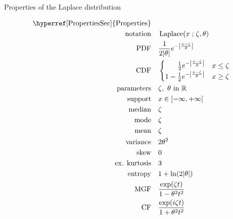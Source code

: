 

\begin{table*}[t!]
\caption[Laplace distribution -- Properties]{Properties of the Laplace distribution}
\begin{align*}
\text{\hyperref[PropertiesSec]{Properties}}  \quad& \\
\text{notation}\quad & \op{Laplace}(x\given \pLoc, \theta) 				\checked
\\ 
\text{PDF} \quad & \frac{1}{2 |\theta|} e^{- \Left|\frac{x-\pLoc}{\theta}\Right|} 	\checked
\\
\text{CDF} \quad & 
\begin{cases}
\phantom{\tfrac{1}{2} -\ } \frac{1}{2} e^{ - \Left|\frac{x-\pLoc}{\theta}\Right| } & x\leq \pLoc  \checked
\\
1 - \tfrac{1}{2} e^{ - \Left|\frac{x-\pLoc}{\theta}\Right| } & x\geq \pLoc 			\checked
\end{cases}
\\
\text{parameters}\quad & \pLoc,\ \theta \text{ in } \mathbb{R}				\checked
\\
\text{support} \quad & x \in [ -\infty, +\infty] 							\checked
\\
\text{median} \quad & \pLoc                            							\checked
\\
\text{mode} \quad & \pLoc 										\checked
\\
\text{mean} \quad & \pLoc  										\checked
\\
\text{variance} \quad & 2\theta^2 									\checked
\\
\text{skew} \quad & 0 											\checked
\\ 
\text{ex. kurtosis} \quad & 3 											\checked
\\ 
\text{entropy} \quad & 1+ \ln( 2 |\theta|) 								\checked
\\ 
\text{MGF} \quad &  \frac{\exp(\pLoc t) }{1- \theta^2 t^2}					\checked
\\
\text{CF} \quad & \frac{\exp(i\pLoc t) }{1+ \theta^2 t^2}					\checked
\end{align*}
\end{table*}